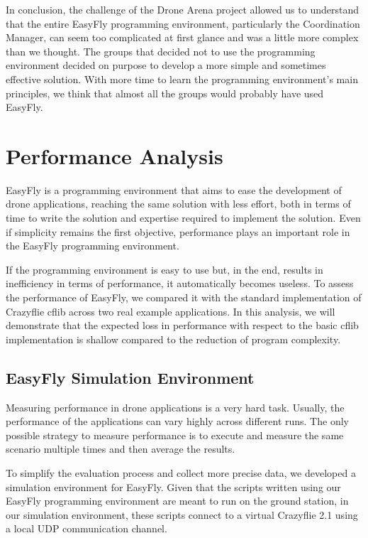 In conclusion, the challenge of the Drone Arena project allowed us to understand that the entire EasyFly programming environment, particularly the Coordination Manager, can seem too complicated at first glance and was a little more complex than we thought.
The groups that decided not to use the programming environment decided on purpose to develop a more simple and sometimes effective solution.
With more time to learn the programming environment's main principles, we think that almost all the groups would probably have used EasyFly. 


\section{Performance Analysis}\label{sec:performance_analysis}

EasyFly is a programming environment that aims to ease the development of drone applications, reaching the same solution with less effort, both in terms of time to write the solution and expertise required to implement the solution.
Even if simplicity remains the first objective, performance plays an important role in the EasyFly programming environment.

If the programming environment is easy to use but, in the end, results in inefficiency in terms of performance, it automatically becomes useless.
To assess the performance of EasyFly, we compared it with the standard implementation of Crazyflie cflib across two real example applications.
In this analysis, we will demonstrate that the expected loss in performance with respect to the basic cflib implementation is shallow compared to the reduction of program complexity.

\subsection{EasyFly Simulation Environment}\label{subsec:simulation_environment}
Measuring performance in drone applications is a very hard task. 
Usually, the performance of the applications can vary highly across different runs.
The only possible strategy to measure performance is to execute and measure the same scenario multiple times and then average the results.

To simplify the evaluation process and collect more precise data, we developed a simulation environment for EasyFly.
Given that the scripts written using our EasyFly programming environment are meant to run on the ground station, 
in our simulation environment, these scripts connect to a virtual Crazyflie 2.1 using a local UDP communication channel.

